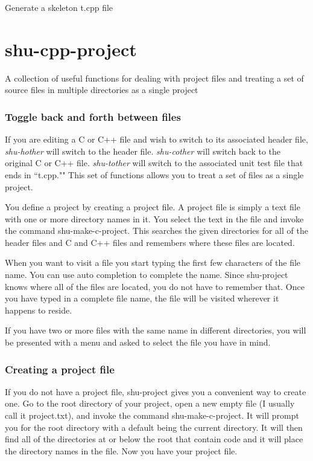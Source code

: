 \begin{doc-string}
Generate a skeleton t.cpp file
\end{doc-string}

\eject
\section{shu-cpp-project}


A collection of useful functions for dealing with project files and treating
a set of source files in multiple directories as a single project

\subsubsection{Toggle back and forth between files}

If you are editing a C or C++ file and wish to switch to its associated
header file, \emph{shu-hother} will switch to the header file.  \emph{shu-cother} will
switch back to the original C or C++ file.  \emph{shu-tother} will switch to the
associated unit test file that ends in ``t.cpp.""
This set of functions allows you to treat a set of files as a single project.

You define a project by creating a project file.  A project file is simply a
text file with one or more directory names in it.  You select the text in the
file and invoke the command shu-make-c-project.  This searches the given
directories for all of the header files and C and C++ files and remembers
where these files are located.

When you want to visit a file you start typing the first few characters of the
file name.  You can use auto completion to complete the name.  Since
shu-project knows where all of the files are located, you do not have to
remember that.  Once you have typed in a complete file name, the file will be
visited wherever it happens to reside.

If you have two or more files with the same name in different directories, you
will be presented with a menu and asked to select the file you have in mind.

\subsubsection{Creating a project file}

If you do not have a project file, shu-project gives you a convenient way to
create one.  Go to the root directory of your project, open a new empty file
(I usually call it project.txt), and invoke the command shu-make-c-project.
It will prompt you for the root directory with a default being the current
directory.  It will then find all of the directories at or below the root that
contain code and it will place the directory names in the file.  Now you have
your project file.

